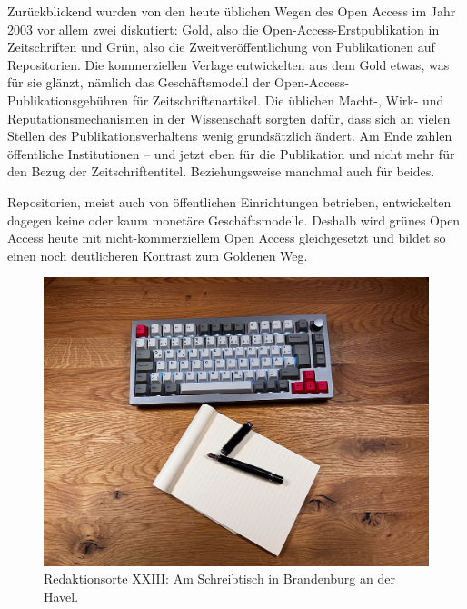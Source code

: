 \documentclass[a4paper,
fontsize=11pt,
oneside,
numbers=noperiodatend,
parskip=half-,
bibliography=totoc,
final
]{scrartcl}
\begin{document}
Zurückblickend wurden von den heute üblichen Wegen des Open Access im
Jahr 2003 vor allem zwei diskutiert: Gold, also die
Open-Access-Erstpublikation in Zeitschriften und Grün, also die
Zweitveröffentlichung von Publikationen auf Repositorien. Die
kommerziellen Verlage entwickelten aus dem Gold etwas, was für sie
glänzt, nämlich das Geschäftsmodell der Open-Access-Publikationsgebühren
für Zeitschriftenartikel. Die üblichen Macht-, Wirk- und
Reputationsmechanismen in der Wissenschaft sorgten dafür, dass sich an
vielen Stellen des Publikationsverhaltens wenig grundsätzlich ändert. Am
Ende zahlen öffentliche Institutionen -- und jetzt eben für die
Publikation und nicht mehr für den Bezug der Zeitschriftentitel.
Beziehungsweise manchmal auch für beides.

Repositorien, meist auch von öffentlichen Einrichtungen betrieben,
entwickelten dagegen keine oder kaum monetäre Geschäftsmodelle. Deshalb
wird grünes Open Access heute mit nicht-kommerziellem Open Access
gleichgesetzt und bildet so einen noch deutlicheren Kontrast zum
Goldenen Weg.

\begin{figure}
\centering
\includegraphics{fig.jpg}
\caption{Redaktionsorte XXIII: Am Schreibtisch in Brandenburg an der
Havel.}
\end{figure}
\end{document}

